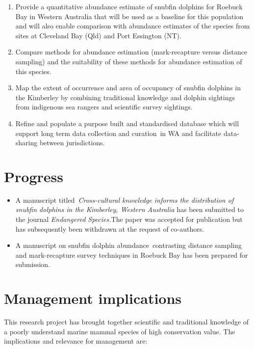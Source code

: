 \documentclass[version=last,
    paper=a4, %
    10pt, %
    usenames,
    dvipsnames,
    oneside, %
    headings=openany, %
    DIV=15 %
]{scrbook}
\begin{document}
\begin{enumerate}
\itemsep1pt\parskip0pt
\item
  Provide a quantitative abundance estimate of snubfin dolphins for
  Roebuck Bay in Western Australia that will be used as a baseline for
  this population and will also enable comparison with abundance
  estimates of the species from sites at Cleveland Bay (Qld) and Port
  Essington (NT).
\item
  Compare methods for abundance estimation (mark-recapture versus
  distance sampling) and the suitability of these methods for abundance
  estimation of this species.
\item
  Map the extent of occurrence and area of occupancy of snubfin dolphins
  in the Kimberley by combining traditional knowledge and dolphin
  sightings from indigenous sea rangers and scientific survey sightings.
\item
  Refine and populate a purpose built and standardised database which
  will support long term data collection and curation~in WA and
  facilitate data-sharing between jurisdictions.
\end{enumerate}



\section*{Progress}
\begin{itemize}
\itemsep1pt\parskip0pt
\item
  A manuscript titled~\emph{Cross-cultural knowledge informs the
  distribution of snubfin dolphins in the Kimberley, Western Australia}
  has been submitted to the journal \emph{Endangered Species.}The paper
  was accepted for publication but has subsequently been withdrawn at
  the request of co-authors.
\item
  A manuscript on snubfin dolphin abundance~contrasting distance
  sampling and mark-recapture survey techniques in Roebuck Bay has been
  prepared for submission.~
\end{itemize}



\section*{Management implications}
This research project has brought together scientific and traditional
knowledge of a poorly understand marine mammal species of high
conservation value. The implications and relevance for management are:
\end{document}
